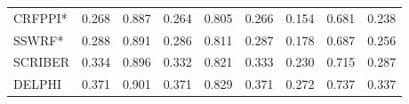 \documentclass{bioinfo}
\begin{document}
\begin{table*}[htbp]
\begin{tabular}{lrrrrrrrr}
    CRFPPI* & \cellcolor[rgb]{ .698,  .78,  .643}0.268 & \cellcolor[rgb]{ .635,  .733,  .569}0.887 & \cellcolor[rgb]{ .714,  .792,  .659}0.264 & \cellcolor[rgb]{ .667,  .757,  .604}0.805 & \cellcolor[rgb]{ .706,  .784,  .651}0.266 & \cellcolor[rgb]{ .698,  .78,  .643}0.154 & \cellcolor[rgb]{ .502,  .635,  .412}0.681 & \cellcolor[rgb]{ .706,  .784,  .651}0.238 \\
    SSWRF* & \cellcolor[rgb]{ .627,  .729,  .561}0.288 & \cellcolor[rgb]{ .549,  .671,  .471}0.891 & \cellcolor[rgb]{ .635,  .733,  .569}0.286 & \cellcolor[rgb]{ .584,  .694,  .506}0.811 & \cellcolor[rgb]{ .631,  .729,  .565}0.287 & \cellcolor[rgb]{ .624,  .725,  .557}0.178 & \cellcolor[rgb]{ .482,  .624,  .388}0.687 & \cellcolor[rgb]{ .639,  .737,  .573}0.256 \\
    SCRIBER & \cellcolor[rgb]{ .463,  .608,  .365}0.334 & \cellcolor[rgb]{ .443,  .592,  .341}0.896 & \cellcolor[rgb]{ .471,  .612,  .373}0.332 & \cellcolor[rgb]{ .443,  .592,  .341}0.821 & \cellcolor[rgb]{ .467,  .612,  .369}0.333 & \cellcolor[rgb]{ .463,  .608,  .365}0.230 & \cellcolor[rgb]{ .4,  .561,  .29}0.715 & \cellcolor[rgb]{ .522,  .651,  .435}0.287 \\
    DELPHI & \cellcolor[rgb]{ .329,  .51,  .208}0.371 & \cellcolor[rgb]{ .329,  .51,  .208}0.901 & \cellcolor[rgb]{ .329,  .51,  .208}0.371 & \cellcolor[rgb]{ .329,  .51,  .208}0.829 & \cellcolor[rgb]{ .329,  .51,  .208}0.371 & \cellcolor[rgb]{ .329,  .51,  .208}0.272 & \cellcolor[rgb]{ .329,  .51,  .208}0.737 & \cellcolor[rgb]{ .329,  .51,  .208}0.337 \\
    \end{tabular}%
  \label{tab_comp_448}%
\end{table*}%
\end{document}

